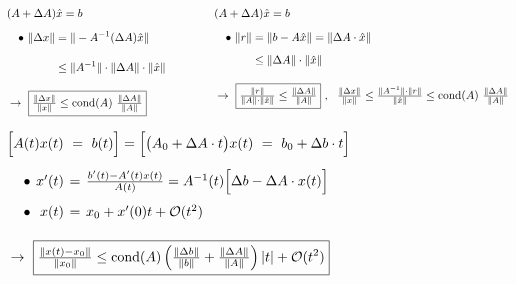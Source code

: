 \documentclass[12pt]{article}
\begin{document}
\vspace{20pt}\noindent
\(\begin{aligned}[t]
	&(A + \Delta A)\hat{x} = b\\[5pt]
	&\hspace{10pt} \begin{aligned}[t]
			\bullet\ \Vert \Delta x \Vert &= \Vert - A^{-1} (\Delta A) \hat{x} \Vert\\[10pt]
			&\leq \Vert A^{-1} \Vert \cdot \Vert \Delta A \Vert \cdot \Vert \hat{x} \Vert
		\end{aligned}\\[10pt]
	&\rightarrow\ \boxed{ \tfrac{\Vert \Delta x \Vert}{\Vert x \Vert} 
		\leq \text{cond}(A)\ \tfrac{\Vert \Delta A \Vert}{\Vert A \Vert}}
\end{aligned}
\hspace{1.5cm}
\begin{aligned}[t]
	&(A + \Delta A)\hat{x} = b\\[5pt]
	&\hspace{10pt} \begin{aligned}
		\bullet\ \Vert r \Vert 
			&= \Vert b - A \hat{x} \Vert
			= \Vert \Delta A \cdot \hat{x} \Vert \\[5pt]
		&\leq \Vert \Delta A \Vert \cdot \Vert \hat{x} \Vert
	\end{aligned}\\[10pt]
	&\rightarrow\ \boxed{ \tfrac{\Vert r \Vert}{\Vert A \Vert \cdot \Vert \hat{x} \Vert} 
		\leq \tfrac{\Vert \Delta A \Vert}{\Vert A \Vert}}
		\ , \ \ \tfrac{\Vert \Delta x \Vert}{\Vert x \Vert} 
		\leq \tfrac{\Vert A^{-1} \Vert \cdot \Vert r \Vert}{\Vert \hat{x} \Vert} 
		\leq \text{cond}(A)\ \tfrac{\Vert \Delta A \Vert}{\Vert A \Vert}
\end{aligned}\)

\vspace{20pt}\noindent
\(\begin{aligned}[t]
	&\Big[ A(t) x(t)\ =\ b(t) \Big] 
		= \Big[ \big(A_0 + \Delta A \cdot t \big) x(t)\ =\ b_0 + \Delta b \cdot t \Big]\\[5pt]
	&\hspace{10pt} \setlength{\arraycolsep}{2pt}\begin{array}{l r c l}
			\bullet&x'(t) &=& \frac{b'(t) - A'(t)x(t)}{A(t)} = A^{-1}(t) \Big[ \Delta b - \Delta A\cdot x(t) \Big]\\[10pt]
			\bullet&x(t) &=& x_0 + x'(0)t + \mathcal{O}(t^2)
		\end{array}\\[10pt]
	&\rightarrow\ \boxed{ \tfrac{\Vert x(t) - x_0 \Vert}{\Vert x_0 \Vert} 
		\leq \text{cond}(A) \left( \tfrac{\Vert \Delta b \Vert}{\Vert b \Vert} 
		+ \tfrac{\Vert \Delta A \Vert}{\Vert A \Vert} \right) \vert t \vert 
		+ \mathcal{O}(t^2)}
\end{aligned}\)
\end{document}
